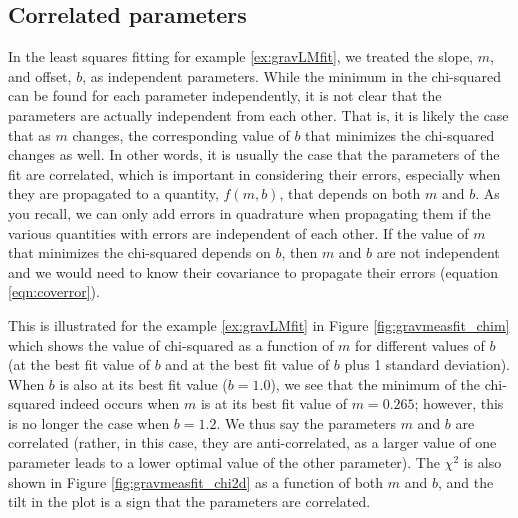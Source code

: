 \subsection{Correlated parameters}

In the least squares fitting for example \ref{ex:gravLMfit}, we treated the slope, $m$, and offset, $b$, as independent parameters. While the minimum in the chi-squared can be found for each parameter independently, it is not clear that the parameters are actually independent from each other. That is, it is likely the case that as $m$ changes, the corresponding value of $b$ that minimizes the chi-squared changes as well. In other words, it is usually the case that the parameters of the fit are correlated, which is important in considering their errors, especially when they are propagated to a quantity, $f(m,b)$, that depends on both $m$ and $b$. As you recall, we can only add errors in quadrature when propagating them if the various quantities with errors are independent of each other. If the value of $m$ that minimizes the chi-squared depends on $b$, then $m$ and $b$ are not independent and we would need to know their covariance to propagate their errors (equation \ref{eqn:coverror}).

This is illustrated for the example \ref{ex:gravLMfit} in Figure \ref{fig:gravmeasfit_chim} which shows the value of chi-squared as a function of $m$ for different values of $b$ (at the best fit value of $b$ and at the best fit value of $b$ plus 1 standard deviation). When $b$ is also at its best fit value ($b=1.0$), we see that the minimum of the chi-squared indeed occurs when $m$ is at its best fit value of $m=0.265$; however, this is no longer the case when $b=1.2$. We thus say the parameters $m$ and $b$ are correlated (rather, in this case, they are anti-correlated, as a larger value of one parameter leads to a lower optimal value of the other parameter). The $\chi^2$ is also shown in Figure \ref{fig:gravmeasfit_chi2d} as a function of both $m$ and $b$, and the tilt in the plot is a sign that the parameters are correlated.

